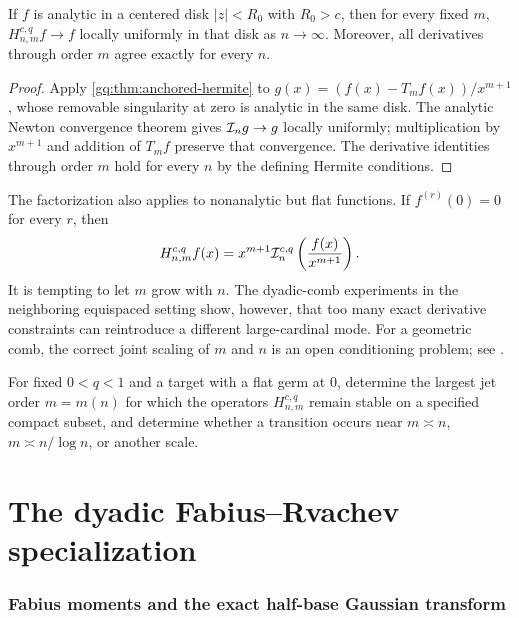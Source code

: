 \begin{corollary}
\label{gq:cor:anchored-analytic}
If $f$ is analytic in a centered disk $|z|<R_0$ with $R_0>c$, then for every
fixed $m$, $H_{n,m}^{c,q}f\to f$ locally uniformly in that disk as
$n\to\infty$.
Moreover, all derivatives through order $m$ agree exactly for every $n$.
\end{corollary}

\begin{proof}
Apply \cref{gq:thm:anchored-hermite} to
$g(x)=(f(x)-T_mf(x))/x^{m+1}$, whose removable singularity at zero is
analytic in the same disk.  The analytic Newton convergence theorem gives
$\mathcal I_ng\to g$ locally uniformly; multiplication by $x^{m+1}$ and
addition of $T_mf$ preserve that convergence.  The derivative identities
through order $m$ hold for every $n$ by the defining Hermite conditions.
\end{proof}

The factorization also applies to nonanalytic but flat functions.  If
$f^{(r)}(0)=0$ for every $r$, then
\begin{equation}
 H_{n,m}^{c,q}f(x)=x^{m+1}\mathcal I_n^{c,q}
                  \left(\frac{f(x)}{x^{m+1}}\right).
 \label{gq:eq:flat-anchored-hermite}
\end{equation}
It is tempting to let $m$ grow with $n$.  The dyadic-comb experiments in the
neighboring equispaced setting show, however, that too many exact derivative
constraints can reintroduce a different large-cardinal mode.  For a
geometric comb, the correct joint scaling of $m$ and $n$ is an open
conditioning problem; see .

\begin{problem}
\label{gq:prob:optimal-geometric-hermite}
For fixed $0<q<1$ and a target with a flat germ at $0$, determine the largest
jet order $m=m(n)$ for which the operators $H_{n,m}^{c,q}$ remain stable on
a specified compact subset, and determine whether a transition occurs near
$m\asymp n$, $m\asymp n/\log n$, or another scale.
\end{problem}

\part{The dyadic Fabius--Rvachev specialization}

\section{Fabius moments and the exact half-base Gaussian transform}
\label{gq:chap:fabius-transform}

